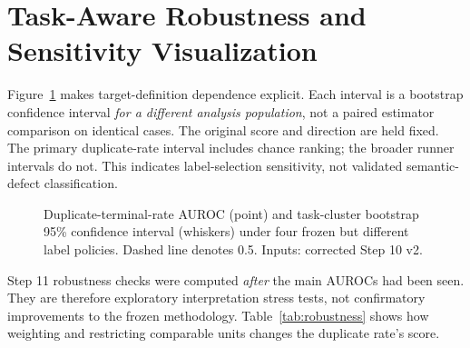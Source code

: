 \section{Task-Aware Robustness and Sensitivity Visualization}\label{sec:robust}
Figure~\ref{fig:labelpolicy} makes target-definition dependence explicit. Each interval is a bootstrap confidence interval \emph{for a different analysis population}, not a paired estimator comparison on identical cases. The original score and direction are held fixed. The primary duplicate-rate interval includes chance ranking; the broader runner intervals do not. This indicates label-selection sensitivity, not validated semantic-defect classification.

\begin{figure}[t]
\centering
{}
\caption{Duplicate-terminal-rate AUROC (point) and task-cluster bootstrap 95\% confidence interval (whiskers) under four frozen but different label policies. Dashed line denotes 0.5. Inputs: corrected Step 10 v2.}
\label{fig:labelpolicy}
\end{figure}

Step 11 robustness checks were computed \emph{after} the main AUROCs had been seen. They are therefore exploratory interpretation stress tests, not confirmatory improvements to the frozen methodology. Table~\ref{tab:robustness} shows how weighting and restricting comparable units changes the duplicate rate's score.

